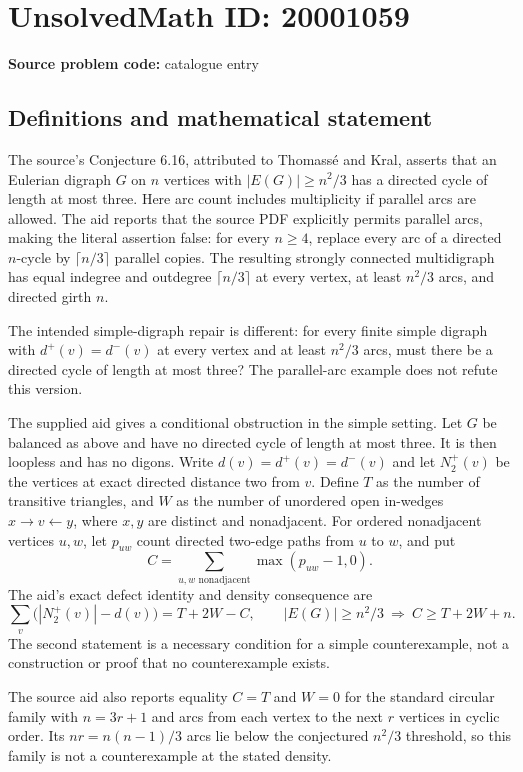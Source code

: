 \documentclass[11pt]{article}
\begin{document}
\section*{UnsolvedMath ID: 20001059}
\textbf{Source problem code:} catalogue entry
\subsection{Definitions and mathematical statement}
The source's Conjecture 6.16, attributed to Thomass\'e and Kral, asserts that an Eulerian digraph $G$ on $n$ vertices with $|E(G)|\geq n^2/3$ has a directed cycle of length at most three. Here arc count includes multiplicity if parallel arcs are allowed. The aid reports that the source PDF explicitly permits parallel arcs, making the literal assertion false: for every $n\geq4$, replace every arc of a directed $n$-cycle by $\lceil n/3\rceil$ parallel copies. The resulting strongly connected multidigraph has equal indegree and outdegree $\lceil n/3\rceil$ at every vertex, at least $n^2/3$ arcs, and directed girth $n$.

The intended simple-digraph repair is different: for every finite simple digraph with $d^+(v)=d^-(v)$ at every vertex and at least $n^2/3$ arcs, must there be a directed cycle of length at most three? The parallel-arc example does not refute this version.

The supplied aid gives a conditional obstruction in the simple setting. Let $G$ be balanced as above and have no directed cycle of length at most three. It is then loopless and has no digons. Write $d(v)=d^+(v)=d^-(v)$ and let $N_2^+(v)$ be the vertices at exact directed distance two from $v$. Define $T$ as the number of transitive triangles, and $W$ as the number of unordered open in-wedges $x\to v\leftarrow y$, where $x,y$ are distinct and nonadjacent. For ordered nonadjacent vertices $u,w$, let $p_{uw}$ count directed two-edge paths from $u$ to $w$, and put
\[
 C=\sum_{u,w\text{ nonadjacent}}\max(p_{uw}-1,0).
\]
The aid's exact defect identity and density consequence are
\[
 \sum_v\bigl(|N_2^+(v)|-d(v)\bigr)=T+2W-C,
 \qquad |E(G)|\geq n^2/3\ \Longrightarrow\ C\geq T+2W+n.
\]
The second statement is a necessary condition for a simple counterexample, not a construction or proof that no counterexample exists.

The source aid also reports equality $C=T$ and $W=0$ for the standard circular family with $n=3r+1$ and arcs from each vertex to the next $r$ vertices in cyclic order. Its $nr=n(n-1)/3$ arcs lie below the conjectured $n^2/3$ threshold, so this family is not a counterexample at the stated density.
\end{document}
